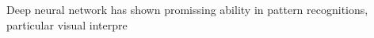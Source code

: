 Deep neural network has shown promissing ability in pattern recognitions, particular visual interpre 